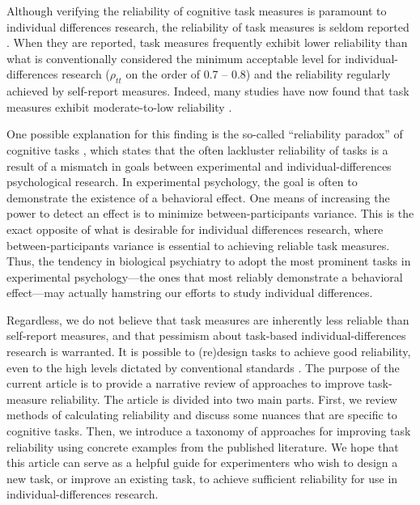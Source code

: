 \documentclass[a4paper,12pt]{article}
\begin{document}

Although verifying the reliability of cognitive task measures is paramount to individual differences research, the reliability of task measures is seldom reported \cite{Green2016-xw, Parsons2019-jw}. When they are reported, task measures frequently exhibit lower reliability than what is conventionally considered the minimum acceptable level for individual-differences research ($\rho_{tt}$ on the order of 0.7 -- 0.8) and the reliability regularly achieved by self-report measures. Indeed, many studies have now found that task measures exhibit moderate-to-low reliability \cite{Hedge2018-lf, Frey2017-uz, Enkavi2019-oh, Von_Bastian2020-tm, Nitsch2022-pe, verdejo2021unified}.

One possible explanation for this finding is the so-called ``reliability paradox'' of cognitive tasks \cite{Hedge2018-lf}, which states that the often lackluster reliability of tasks is a result of a mismatch in goals between experimental and individual-differences psychological research. In experimental psychology, the goal is often to demonstrate the existence of a behavioral effect. One means of increasing the power to detect an effect is to minimize between-participants variance. This is the exact opposite of what is desirable for individual differences research, where between-participants variance is essential to achieving reliable task measures. Thus, the tendency in biological psychiatry to adopt the most prominent tasks in experimental psychology---the ones that most reliably demonstrate a behavioral effect---may actually hamstring our efforts to study individual differences. 


Regardless, we do not believe that task measures are inherently less reliable than self-report measures, and that pessimism about task-based individual-differences research is warranted. It is possible to (re)design tasks to achieve good reliability, even to the high levels dictated by conventional standards \cite{waltmann2022sufficient, sullivan2022enhancing, kucina2022solution, snijder2022psychometric}. The purpose of the current article is to provide a narrative review of approaches to improve task-measure reliability. The article is divided into two main parts. First, we review methods of calculating reliability and discuss some nuances that are specific to cognitive tasks. Then, we introduce a taxonomy of approaches for improving task reliability using concrete examples from the published literature. We hope that this article can serve as a helpful guide for experimenters who wish to design a new task, or improve an existing task, to achieve sufficient reliability for use in individual-differences research.
\end{document}
